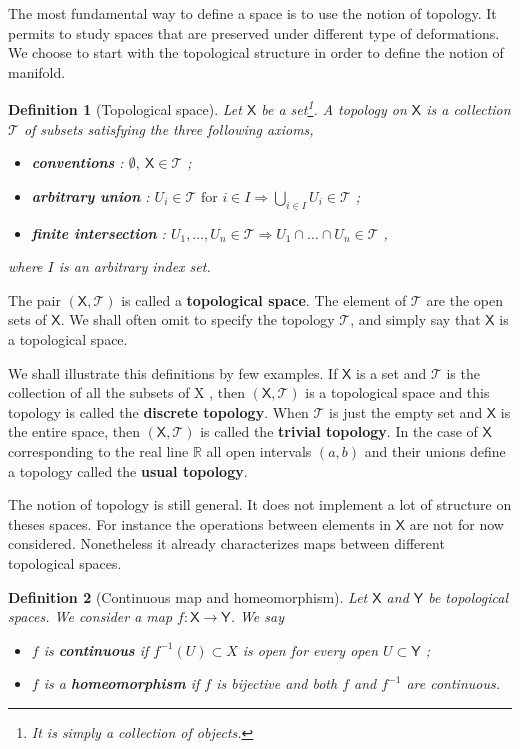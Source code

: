 \documentclass[11pt]{book}
\newcommand{\Tcal}{\mathcal{T}}
\newcommand{\Rbb}{\mathbb{R}}
\newcommand{\Xsf}{\mathsf{X}}
\newcommand{\Ysf}{\mathsf{Y}}
\theoremstyle{break}
\newtheorem{definition}{Definition}[chapter]
\begin{document}
The most fundamental way to define a space is to use the notion of topology. It permits to study spaces that are preserved under different type of deformations. We choose to start with the topological structure in order to define the notion of manifold.


\begin{definition}[Topological space]
Let $\Xsf$ be a set\footnote{It is simply a collection of objects.}. A topology on $\Xsf$ is a collection $\Tcal$ of subsets satisfying the three following axioms,%
%
\begin{itemize}
\item \textbf{conventions} : $\emptyset , \ \Xsf \in \Tcal$ ;
\item \textbf{arbitrary union} : $U_i \in \Tcal \mbox{ for } i \in I \Longrightarrow \bigcup_{i\in I} U_i \in \Tcal$ ;
\item \textbf{finite intersection} : $U_1 , \dots , U_n \in \Tcal \Longrightarrow U_1 \cap \dots \cap U_n \in \Tcal$ ,
\end{itemize}
%
where $I$ is an arbitrary index set.
\end{definition}
%
The pair $(\Xsf,\Tcal)$ is called a \textbf{topological space}. The element of $\Tcal$ are the open sets of $\Xsf$. We shall often omit to specify the topology $\Tcal$, and simply say that $\Xsf$ is a topological space. 


\bigskip


We shall illustrate this definitions by few examples. If $\Xsf$ is a set and $\Tcal$ is the collection of all the subsets of X , then $(\Xsf,\Tcal)$ is a topological space and this topology is called the \textbf{discrete topology}. When $\Tcal$ is just the empty set and $\Xsf$ is the entire space, then $(\Xsf,\Tcal)$ is called the \textbf{trivial topology}. In the case of $\Xsf$ corresponding to the real line $\Rbb$ all open intervals $(a,b)$ and their unions define a topology called the \textbf{usual topology}. 


\bigskip


The notion of topology is still general. It does not implement a lot of structure on theses spaces. For instance the operations between elements in $\Xsf$ are not for now considered. Nonetheless it already characterizes maps between different topological spaces.


\begin{definition}[Continuous map and homeomorphism]
%
Let $\Xsf$ and $\Ysf$ be topological spaces. We consider a map $f : \Xsf \to \Ysf$. We say
%
\begin{itemize}
\item $f$ is \textbf{continuous} if $f^{-1}(U) \subset X$ is open for every open $U \subset\Ysf$ ;
\item $f$ is a \textbf{homeomorphism} if $f$ is bijective and both $f$ and $f^{-1}$ are continuous.
\end{itemize}
%
\end{definition}
\end{document}
